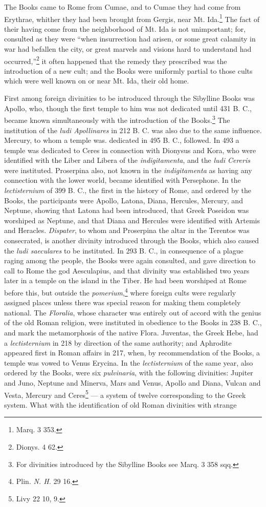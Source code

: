 \documentclass[a4paper, 11pt, oneside, polutonikogreek, english]{article}
\begin{document}
The Books came to Rome from Cumae, and to Cumae they had come from Erythrae, whither they had been brought from Gergis, near Mt. Ida.\footnote{Marq. 3 353.} The fact of their having come from the neighborhood of Mt. Ida is not unimportant; for, consulted as they were ``when insurrection had arisen, or some great calamity in war had befallen the city, or great marvels and visions hard to understand had occurred,''\footnote{Dionys. 4 62.} it often happened that the remedy they prescribed was the introduction of a new cult; and the Books were uniformly partial to those cults which were well known on or near Mt. Ida, their old home.

First among foreign divinities to be introduced through the Sibylline Books was Apollo, who, though the first temple to him was not dedicated until 431 B. C., became known simultaneously with the introduction of the Books.\footnote{For divinities introduced by the Sibylline Books see Marq. 3 358 sqq.} The institution of the \emph{ludi Apollinares} in 212 B. C. was also due to the same influence. Mercury, to whom a temple was. dedicated in 495 B. C., followed. In 493 a temple was dedicated to Ceres in connection with Dionysus and Kora, who were identified with the Liber and Libera of the \emph{indigitamenta}, and the \emph{ludi Cereris} were instituted. Proserpina also, not known in the \emph{indigitamenta} as having any connection with the lower world, became identified with Persephone. In the \emph{lectisternium} of 399 B. C., the first in the history of Rome, and ordered by the Books, the participants were Apollo, Latona, Diana, Hercules, Mercury, and Neptune, showing that Latona had been introduced, that Greek Poseidon was worshiped as Neptune, and that Diana and Hercules were identified with Artemis and Heracles. \emph{Dispater}, to whom and Proserpina the altar in the Terentos was consecrated, is another divinity introduced through the Books, which also caused the \emph{ludi saeculares} to be instituted. In 293 B. C., in consequence of a plague raging among the people, the Books were again consulted, and gave direction to call to Rome the god Aesculapius, and that divinity was established two years later in a temple on the island in the Tiber. He had been worshiped at Rome before this, but outside the \emph{pomerium},\footnote{Plin. \emph{N. H.} 29 16.} where foreign cults were regularly assigned places unless there was special reason for making them completely national. The \emph{Floralia}, whose character was entirely out of accord with the genius of the old Roman religion, were instituted in obedience to the Books in 238 B. C., and mark the metamorphosis of the native Flora. Juventas, the Greek Hebe, had a \emph{lectisternium} in 218 by direction of the same authority; and Aphrodite appeared first in Roman affairs in 217, when, by recommendation of the Books, a temple was vowed to Venus Erycina. In the \emph{lectisternium} of the same year, also ordered by the Books, were six \emph{pulvinaria}, with the following divinities: Jupiter and Juno, Neptune and Minerva, Mars and Venus, Apollo and Diana, Vulcan and Vesta, Mercury and Ceres\footnote{Livy 22 10, 9.} --- a system of twelve corresponding to the Greek system. What with the identification of old Roman divinities with strange 
\end{document}
